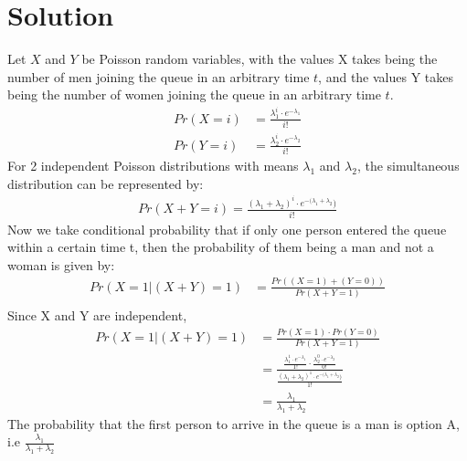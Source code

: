 \documentclass[twocolumn]{article}
\providecommand{\brak}[1]{\ensuremath{\left(#1\right)}}
\theoremstyle{remark}
\numberwithin{equation}{subsection}
\begin{document}
\section{Solution}
Let $X$ and $Y$ be Poisson random variables, with the values X takes being the number of men joining the queue in an arbitrary time $t$, and the values Y takes being the number of women joining the queue in an arbitrary time $t$.
\begin{align}
    Pr\brak{X=i}&=\frac{\lambda_1^i\cdot e^{-\lambda_1}}{i!}\\
    Pr\brak{Y=i}&=\frac{\lambda_2^i\cdot e^{-\lambda_2}}{i!}
\end{align}
For 2 independent Poisson distributions with means $\lambda_1$ and $\lambda_2$, the simultaneous distribution can be represented by:
\begin{align}
    Pr\brak{X+Y=i}=\frac{(\lambda_1+\lambda_2)^i\cdot e^{-(\lambda_1+\lambda_2})}{i!}
\end{align}
Now we take conditional probability that if only one person entered the queue within a certain time t, then the probability of them being a man and not a woman is given by:
\begin{align}
    Pr\brak{X=1|(X+Y)=1}&=\frac{Pr\brak{(X=1) + (Y=0)}}{Pr\brak{X+Y=1}}\\
\end{align}
Since X and Y are independent, 
\begin{align}
    Pr\brak{X=1|(X+Y)=1}&=\frac{Pr\brak{X=1}\cdot Pr\brak{Y=0}}{Pr\brak{X+Y=1}}\\
    &=\frac{\frac{\lambda_1^1\cdot e^{-\lambda_1}}{1!}\cdot \frac{\lambda_2^0\cdot e^{-\lambda_2}}{0!}}{\frac{(\lambda_1+\lambda_2)^1\cdot e^{-(\lambda_1+\lambda_2})}{1!}}\\
    &=\frac{\lambda_1}{\lambda_1+\lambda_2}
\end{align}
 The probability that the first person to arrive in the queue is a man is option A, i.e $\frac{\lambda_1}{\lambda_1+\lambda_2}$
\end{document}
